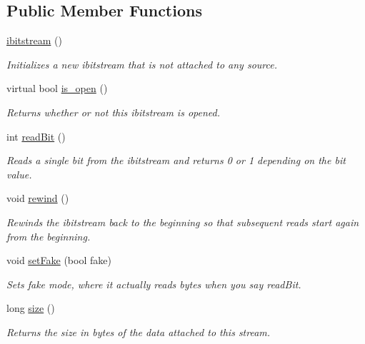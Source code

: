 \subsection*{Public Member Functions}
\begin{DoxyCompactItemize}
\item 
\mbox{\hyperlink{classibitstream_a72d1e7b784e2782d57a9ce3954a1f94f}{ibitstream}} ()
\begin{DoxyCompactList}\small\item\em Initializes a new ibitstream that is not attached to any source. \end{DoxyCompactList}\item 
virtual bool \mbox{\hyperlink{classibitstream_a2f57f54d8c03b615bb31eee091d8a88a}{is\+\_\+open}} ()
\begin{DoxyCompactList}\small\item\em Returns whether or not this ibitstream is opened. \end{DoxyCompactList}\item 
int \mbox{\hyperlink{classibitstream_aa8c615fa7957fb0232a0873dadbd39e8}{read\+Bit}} ()
\begin{DoxyCompactList}\small\item\em Reads a single bit from the ibitstream and returns 0 or 1 depending on the bit value. \end{DoxyCompactList}\item 
void \mbox{\hyperlink{classibitstream_ab8734e666421c9fe3b6380a818c6c727}{rewind}} ()
\begin{DoxyCompactList}\small\item\em Rewinds the ibitstream back to the beginning so that subsequent reads start again from the beginning. \end{DoxyCompactList}\item 
void \mbox{\hyperlink{classibitstream_ad916b4624eb09d375514964f867b475c}{set\+Fake}} (bool fake)
\begin{DoxyCompactList}\small\item\em Sets \textquotesingle{}fake\textquotesingle{} mode, where it actually reads bytes when you say read\+Bit. \end{DoxyCompactList}\item 
long \mbox{\hyperlink{classibitstream_a22727e9c338fb1aaa6722031445373c3}{size}} ()
\begin{DoxyCompactList}\small\item\em Returns the size in bytes of the data attached to this stream. \end{DoxyCompactList}\end{DoxyCompactItemize}


